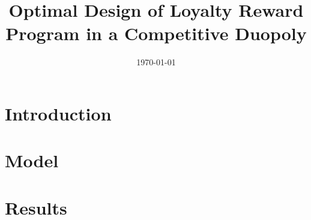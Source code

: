 \documentclass[12pt,a4paper]{article}
\title{Optimal Design of Loyalty Reward Program in a Competitive Duopoly}
\date{\today}
\begin{document}
\maketitle

\section{Introduction}
%
\section{Model}

\section{Results}



\end{document}
